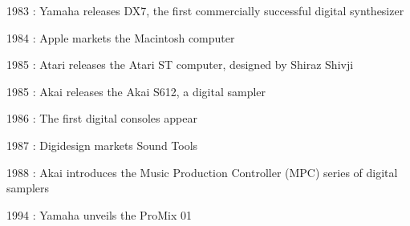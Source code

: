 \documentclass[12pt]{report}
\begin{document}
\begin{adjustwidth}{0.5in}{0.0in}
1983 : Yamaha releases DX7, the first commercially successful digital synthesizer\par

\end{adjustwidth}

\begin{adjustwidth}{0.5in}{0.0in}
1984 : Apple markets the Macintosh computer\par

\end{adjustwidth}

\begin{adjustwidth}{0.5in}{0.0in}
1985 : Atari releases the Atari ST computer, designed by Shiraz Shivji\par

\end{adjustwidth}

\begin{adjustwidth}{0.5in}{0.0in}
1985 : Akai releases the Akai S612, a digital sampler\par

\end{adjustwidth}

\begin{adjustwidth}{0.5in}{0.0in}
1986 : The first digital consoles appear\par

\end{adjustwidth}

\begin{adjustwidth}{0.5in}{0.0in}
1987 : Digidesign markets Sound Tools\par

\end{adjustwidth}

\begin{adjustwidth}{0.5in}{0.0in}
1988 : Akai introduces the Music Production Controller (MPC) series of digital samplers\par

\end{adjustwidth}

\begin{adjustwidth}{0.5in}{0.0in}
1994 : Yamaha unveils the ProMix 01\par

\end{adjustwidth}


\vspace{\baselineskip}
\end{document}
